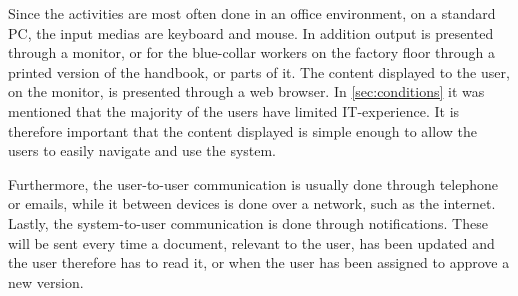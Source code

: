 Since the activities are most often done in an office environment, on a standard PC, the input medias are keyboard and mouse.
In addition output is presented through a monitor, or for the blue-collar workers on the factory floor through a printed version of the handbook, or parts of it.
The content displayed to the user, on the monitor, is presented through a web browser.
In \cref{sec:conditions} it was mentioned that the majority of the users have limited IT-experience.
It is therefore important that the content displayed is simple enough to allow the users to easily navigate and use the system.

Furthermore, the user-to-user communication is usually done through telephone or emails, while it between devices is done over a network, such as the internet.
Lastly, the system-to-user communication is done through notifications.
These will be sent every time a document, relevant to the user, has been updated and the user therefore has to read it, or when the user has been assigned to approve a new version.

